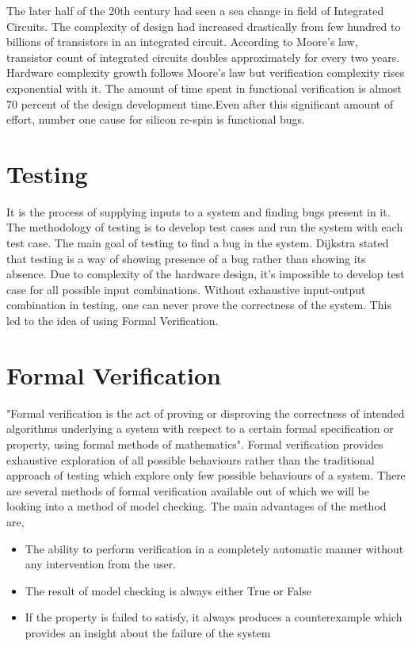 The later half of the 20th century had seen a sea change in field of Integrated Circuits. The complexity of design had increased drastically from few hundred to billions of transistors in an integrated circuit. According to Moore's law, transistor count of integrated circuits doubles approximately for every two years. Hardware complexity growth follows Moore's law but verification complexity rises exponential with it\cite{Alok 2010}. The amount of time spent in functional verification is almost 70 percent of the design development time\cite{Alok 2010}.Even after this significant amount of effort, number one cause for silicon re-spin is functional bugs. 
\section{Testing}
It is the process of supplying inputs to a system and finding bugs present in it. The methodology of testing is to develop test cases and run the system with each test case. The main goal of testing to find a bug in the system. Dijkstra stated that testing is a way of showing presence of a bug rather than showing its absence\cite{Dijkstra 1972}. Due to complexity of the hardware design, it's impossible to develop test case for all possible input combinations. Without exhaustive input-output combination in testing, one can never prove the correctness of the system. This led to the idea of using Formal Verification.
\section{Formal Verification}
"Formal verification is the act of proving or disproving the correctness of intended algorithms underlying a system with respect to a certain formal specification or property, using formal methods of mathematics"\cite{Alok 2010}. Formal verification provides exhaustive exploration of all possible behaviours rather than the traditional approach of testing which explore only few possible behaviours of a system. There are several methods of formal verification available out of which we will be looking into a method of model checking. The main advantages of the method are,
\begin{itemize}
\item The ability to perform verification in a completely automatic manner without any intervention from the user.
\item The result of model checking is always either True or False
\item If the property is failed to satisfy, it always produces a counterexample which provides an insight about the failure of the system
\end{itemize}
